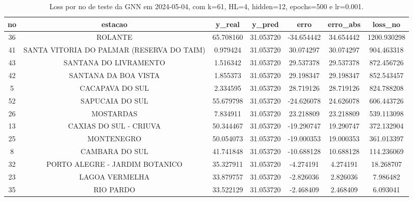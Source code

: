 \begin{table}[h]
\centering
\caption{Loss por no de teste da GNN em 2024-05-04, com k=61, HL=4, hidden=12, epochs=500 e lr=0.001.}
\label{tab:gnn_loss_k61_hl4_h12_e500_d20240504}
\begin{tabular}{ccccccc}
\toprule
no & estacao & y\_real & y\_pred & erro & erro\_abs & loss\_no \\
\midrule
36 & ROLANTE & 65.708160 & 31.053720 & -34.654442 & 34.654442 & 1200.930298 \\
41 & SANTA VITORIA DO PALMAR (RESERVA DO TAIM) & 0.979424 & 31.053720 & 30.074297 & 30.074297 & 904.463318 \\
43 & SANTANA DO LIVRAMENTO & 1.516342 & 31.053720 & 29.537378 & 29.537378 & 872.456726 \\
42 & SANTANA DA BOA VISTA & 1.855373 & 31.053720 & 29.198347 & 29.198347 & 852.543457 \\
5 & CACAPAVA DO SUL & 2.334595 & 31.053720 & 28.719126 & 28.719126 & 824.788208 \\
52 & SAPUCAIA DO SUL & 55.679798 & 31.053720 & -24.626078 & 24.626078 & 606.443726 \\
26 & MOSTARDAS & 7.834911 & 31.053720 & 23.218809 & 23.218809 & 539.113098 \\
13 & CAXIAS DO SUL - CRIUVA & 50.344467 & 31.053720 & -19.290747 & 19.290747 & 372.132904 \\
25 & MONTENEGRO & 50.054073 & 31.053720 & -19.000353 & 19.000353 & 361.013397 \\
8 & CAMBARA DO SUL & 41.741848 & 31.053720 & -10.688128 & 10.688128 & 114.236069 \\
32 & PORTO ALEGRE - JARDIM BOTANICO & 35.327911 & 31.053720 & -4.274191 & 4.274191 & 18.268707 \\
23 & LAGOA VERMELHA & 33.879757 & 31.053720 & -2.826036 & 2.826036 & 7.986482 \\
35 & RIO PARDO & 33.522129 & 31.053720 & -2.468409 & 2.468409 & 6.093041 \\
\bottomrule
\end{tabular}
\end{table}
